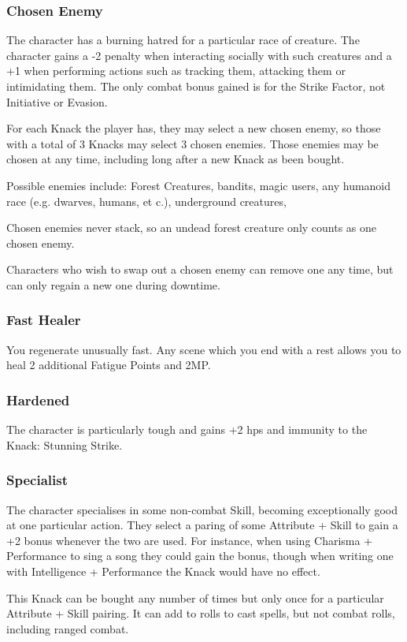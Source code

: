 \begin{multicols}{2}

\subsubsection{Chosen Enemy}

The character has a burning hatred for a particular race of creature.
The character gains a -2 penalty when interacting socially with such creatures and a +1 when performing actions such as tracking them, attacking them or intimidating them.
The only combat bonus gained is for the Strike Factor, not Initiative or Evasion.

For each Knack the player has, they may select a new chosen enemy, so those with a total of 3 Knacks may select 3 chosen enemies. Those enemies may be chosen at any time, including long after a new Knack as been bought.

Possible enemies include: Forest Creatures, bandits, magic users, any humanoid race (e.g. dwarves, humans, et c.), underground creatures, %
\iftoggle{aif}%
{undead, nura humanoids, and nura beasts.%
\footnote{See Adventures in Fenestra, \autoref{nura}.}}%
{and undead.}%

Chosen enemies never stack, so an undead forest creature only counts as one chosen enemy.

Characters who wish to swap out a chosen enemy can remove one any time, but can only regain a new one during downtime.

\subsubsection{Fast Healer}

You regenerate unusually fast. Any scene which you end with a rest allows you to heal 2 additional Fatigue Points and 2MP.

\subsubsection{Hardened}

The character is particularly tough and gains +2 \glspl{hp} and immunity to the Knack: Stunning Strike.

\subsubsection{Specialist}

The character specialises in some non-combat Skill, becoming exceptionally good at one particular action. They select a paring of some Attribute + Skill to gain a +2 bonus whenever the two are used. For instance, when using Charisma + Performance to sing a song they could gain the bonus, though when writing one with Intelligence + Performance the Knack would have no effect.

This Knack can be bought any number of times but only once for a particular Attribute + Skill pairing. It can add to rolls to cast spells, but not combat rolls, including ranged combat.

\end{multicols}


